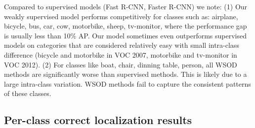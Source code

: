 \documentclass[10pt,twocolumn,letterpaper]{article}
\begin{document}
Compared to supervised models (Fast R-CNN, Faster R-CNN) we note: (1) Our weakly supervised model performs competitively for classes such as: airplane, bicycle, bus, car, cow, motorbike, sheep, tv-monitor, where the performance gap is usually less than 10\% AP. Our model sometimes even outperforms supervised models on categories that are considered relatively easy with small intra-class difference (bicycle and motorbike in VOC 2007, motorbike and tv-monitor in VOC 2012). (2) For classes like boat, chair, dinning table, person, all WSOD methods are significantly worse than supervised methods. This is likely due to a large intra-class variation. WSOD methods fail to capture the consistent patterns of these classes.

\subsection{Per-class correct localization results}
\end{document}
